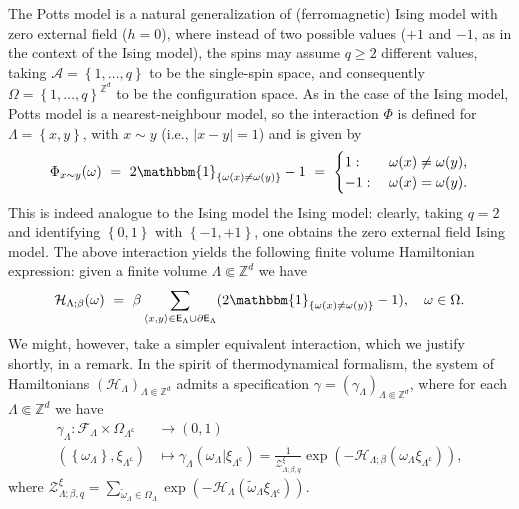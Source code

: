 \documentclass[12pt]{article}
\newcommand{\A}{\mathcal{A}}
\newcommand{\E}{\mathsf{E}}
\newcommand{\F}{\mathcal{F}}
\renewcommand{\H}{\mathcal{H}}
\newcommand{\Z}{\mathbb{Z}}
\newcommand{\ZZ}{\mathcal{Z}}
\newcommand{\set}[1]{\left\{#1\right\}}
\newcommand{\oklepaj}[1]{\left(#1\right)}
\newcommand{\ra}{\rightarrow}
\newcommand{\1}{\mathbbm{1}}
\renewcommand{\sp}[1]{\langle #1\rangle}
\renewcommand{\c}{\mathsf{c}}
\newcommand{\5}{\vspace{0.5cm}}
\renewcommand{\tilde}{\widetilde}
\theoremstyle{definition}
\begin{document}
The Potts model is a natural generalization of (ferromagnetic) Ising model with zero external field ($h=0$), where instead of two possible values ($+1$ and $-1$, as in the context of the Ising model), the spins may assume $q\geq 2$ different values, taking $\A=\set{1,\ldots,q}$ to be the single-spin space, and consequently $\Omega=\set{1,\ldots,q}^{\Z^d}$ to be the configuration space. As in the case of the Ising model, Potts model is a nearest-neighbour model, so the interaction $\Phi$ is defined for $\Lambda=\set{x,y}$, with $x\sim y$ (i.e., $|x-y|=1$) and is given by
$$\Phi_{x\sim y}(\omega) ~=~ 2\1_{\set{\omega(x)\neq \omega(y)}}-1 ~=~ \begin{cases}
1: ~&\omega(x)\neq\omega(y), \\
-1: ~&\omega(x)=\omega(y).
\end{cases}$$
This is indeed analogue to the Ising model the Ising model: clearly, taking $q=2$ and identifying $\set{0,1}$ with $\set{-1,+1}$, one obtains the zero external field Ising model. The above interaction yields the following finite volume Hamiltonian expression: given a finite volume $\Lambda\Subset\Z^d$ we have
$$\H_{\Lambda;\beta}(\omega) ~=~ \beta\sum_{\sp{x,y}\in\E_\Lambda\cup\partial\E_\Lambda}(2\1_{\set{\omega(x)\neq\omega(y)}}-1), \quad \omega\in\Omega.$$
We might, however, take a simpler equivalent interaction, which we justify shortly, in a remark. In the spirit of thermodynamical formalism, the system of Hamiltonians $(\H_\Lambda)_{\Lambda\Subset\Z^d}$ admits a specification $\gamma=(\gamma_\Lambda)_{\Lambda\Subset\Z^d}$, where for each $\Lambda\Subset\Z^d$ we have
\begin{align*}
\gamma_\Lambda:\F_\Lambda\times\Omega_{\Lambda^\c}&\ra (0,1) \\
(\set{\omega_{\Lambda}},\xi_{\Lambda^\c})&\mapsto\gamma_{\Lambda}(\omega_{\Lambda}|\xi_{\Lambda^\c})=\frac{1}{\ZZ_{\Lambda;\beta,q}^\xi}\exp\!\oklepaj{-\H_{\Lambda;\beta}(\omega_\Lambda\xi_{\Lambda^\c})},
\end{align*}
where $\ZZ_{\Lambda;\beta,q}^\xi=\sum_{\tilde{\omega}_\Lambda\in\Omega_\Lambda}\exp\!\oklepaj{-\H_\Lambda(\tilde{\omega}_{\Lambda}\xi_{\Lambda^\c})}$.
\end{document}
